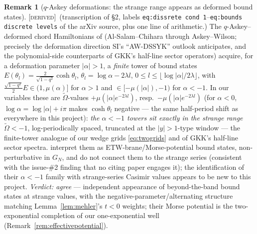 \documentclass[11pt,a4paper]{article}
\newcommand{\DERIVED}{{\color{teal}\textsc{[derived]}}}
\theoremstyle{definition}
\newtheorem{remark}[definition]{Remark}
\theoremstyle{plain}
\newcommand{\tCas}{\tilde\Omega}                %
\begin{document}

\begin{remark}[$q$-Askey deformations: the strange range appears as deformed bound states]
\label{rem:qaskeycheck}
\DERIVED\ (transcription of \cite{Aguilar:2026qaskey} \S2, labels
\texttt{eq:dissrete cond 1}--\texttt{eq:bounds discrete levels} of the arXiv source, plus
one line of arithmetic.) The $q$-Askey--deformed chord Hamiltonians of
\cite{Aguilar:2026qaskey} (Al-Salam--Chihara through Askey--Wilson; precisely the
deformation direction SI's ``AW-DSSYK'' outlook anticipates, and the polynomial-side
counterparts of GKK's half-line sector operators) acquire, for a deformation parameter
$|\alpha|>1$, a \emph{finite} tower of bound states
$E(\theta_{l})=\tfrac{2}{\sqrt{1-q^{2}}}\cosh\theta_{l}$, $\theta_{l}=\log\alpha-2\lambda
l$, $0\le l\le\lfloor\log|\alpha|/2\lambda\rfloor$, with
$\tfrac{\sqrt{1-q^{2}}}{2}E\in(1,\mu(\alpha)]$ for $\alpha>1$ and
$\in[-\mu(|\alpha|),-1)$ for $\alpha<-1$. In our variables these are $\tCas$-values
$+\mu(|\alpha|e^{-2\lambda l})$, resp.\ $-\mu(|\alpha|e^{-2\lambda l})$ (for $\alpha<0$,
$\log\alpha=\log|\alpha|+i\pi$ makes $\cosh\theta_{l}$ negative --- the same half-period
shift as everywhere in this project): \emph{the $\alpha<-1$ towers sit exactly in the
strange range} $\tCas<-1$, log-periodically spaced, truncated at the $|y|>1$-type window
--- the finite-tower analogue of our wedge grids \eqref{eq:twogrids} and of GKK's
half-line sector spectra. \cite{Aguilar:2026qaskey} interpret them as
ETW-brane/Morse-potential bound states, non-perturbative in $G_{N}$, and do not connect
them to the strange series (consistent with the issue-\#2 finding that no citing paper
engages it); the identification of their $\alpha<-1$ family with strange-series Casimir
values appears to be new to this project. \emph{Verdict: agree} --- independent appearance
of beyond-the-band bound states at strange values, with the negative-parameter/alternating
structure matching Lemma~\ref{lem:mehler}'s $t<0$ weights; their Morse potential is the
two-exponential completion of our one-exponential well
(Remark~\ref{rem:effectivepotential}).
\end{remark}
\end{document}
